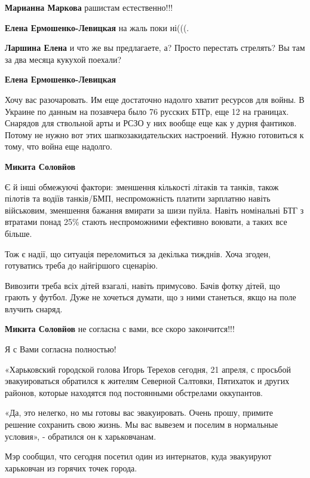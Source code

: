 \begin{itemize}
\begin{itemize}
\textbf{Марианна Маркова} рашистам естественно!!!

\textbf{Елена Ермошенко-Левицкая} на жаль поки ні(((.

\textbf{Ларшина Елена} и что же вы предлагаете, а?
Просто перестать стрелять?
Вы там за два месяца кукухой поехали?

\textbf{Елена Ермошенко-Левицкая} 

Хочу вас разочаровать. Им еще достаточно надолго хватит ресурсов для войны. В
Украине по данным на позавчера было 76 русских БТГр, еще 12 на границах.
Снарядов для ствольной арты и РСЗО у них вообще еще как у дурня фантиков.
Потому не нужно вот этих шапкозакидательских настроений. Нужно готовиться к
тому, что война еще надолго.

\textbf{Микита Соловйов} 

Є й інші обмежуючі фактори: зменшення кількості літаків та танків, також
пілотів та водіїв танків/БМП, неспроможність платити зарплатню навіть
військовим, зменшення бажання вмирати за шизи пуйла. Навіть номінальні БТГ з
втратами понад 25\% стають неспроможними ефективно воювати, а таких все більше.

Тож є надії, що ситуація переломиться за декілька тижднів. Хоча згоден,
готуватись треба до найгіршого сценарію.

Вивозити треба всіх дітей взагалі, навіть примусово. Бачів фотку дітей, що
грають у футбол. Дуже не хочеться думати, що з ними станеться, якщо на поле
влучить снаряд.

\textbf{Микита Соловйов} не согласна с вами, все скоро закончится!!!

\end{itemize} %

Я с Вами согласна полностью!


«Харьковский городской голова Игорь Терехов сегодня, 21 апреля, с просьбой
эвакуироваться обратился к жителям Северной Салтовки, Пятихаток и других
районов, которые находятся под постоянными обстрелами оккупантов.

«Да, это нелегко, но мы готовы вас эвакуировать. Очень прошу, примите решение
сохранить свою жизнь. Мы вас вывезем и поселим в нормальные условия», -
обратился он к харьковчанам.

Мэр сообщил, что сегодня посетил один из интернатов, куда эвакуируют харьковчан
из горячих точек города.


\end{itemize}
